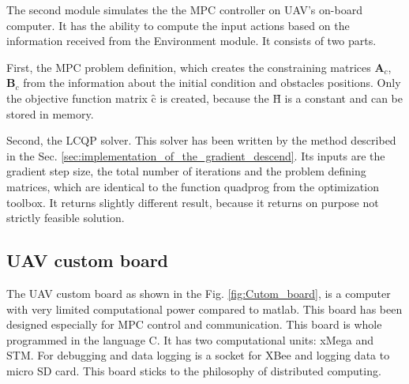 \documentclass[a4paper,11pt,titlepage]{article}
\newcommand{\macHr}{\textbf{\^H}}
\newcommand{\maccr}{\textbf{\^c}}
\begin{document}
The second module simulates the the MPC controller on UAV's on-board computer. It has the ability to compute the input actions based on the information received from the Environment module. It consists of two parts. 

First, the MPC problem definition, which creates the constraining matrices $\textbf{A}_c$, $\textbf{B}_c$ from the information about the initial condition and obstacles positions. Only the objective function matrix $\maccr$ is created, because the $\macHr$ is a constant and can be stored in memory.

Second, the LCQP solver. This solver has been written by the method described in the Sec. \ref{sec:implementation_of_the_gradient_descend}. Its inputs are the gradient step size, the total number of iterations and the problem defining matrices, which are identical to the function quadprog from the optimization toolbox. It returns slightly different result, because it returns on purpose not strictly feasible solution. 



\subsection{UAV custom board}
\label{sec:custom_board}
The UAV custom board \cite{tomas} as shown in the Fig. \ref{fig:Cutom_board}, is a computer with very limited computational power compared to matlab. This board has been designed \cite{tomas} especially for MPC control and communication. This board is whole programmed in the language C. It has two computational units: xMega and STM. For debugging and data logging is a socket for XBee and logging data to micro SD card. This board sticks to the philosophy of distributed computing.
\end{document}
